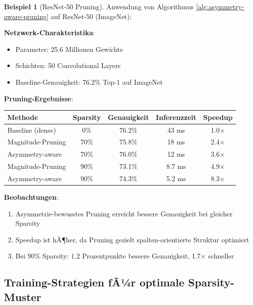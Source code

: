 ﻿\documentclass[a4paper,12pt]{report}
\theoremstyle{definition}
\newtheorem{beispiel}{Beispiel}
\begin{document}
	\begin{beispiel}[ResNet-50 Pruning]
		Anwendung von Algorithmus \ref{alg:asymmetry-aware-pruning} auf ResNet-50 (ImageNet):
		
		\textbf{Netzwerk-Charakteristika}:
		\begin{itemize}
			\item Parameter: 25.6 Millionen Gewichte
			\item Schichten: 50 Convolutional Layers
			\item Baseline-Genauigkeit: 76.2\% Top-1 auf ImageNet
		\end{itemize}
		
		\textbf{Pruning-Ergebnisse}:
		\begin{center}
			\begin{tabular}{|l|c|c|c|c|}
				\hline
				\textbf{Methode} & \textbf{Sparsity} & \textbf{Genauigkeit} & \textbf{Inferenzzeit} & \textbf{Speedup} \\
				\hline
				Baseline (dense) & 0\% & 76.2\% & 43 ms & 1.0$\times$ \\
				Magnitude-Pruning & 70\% & 75.8\% & 18 ms & 2.4$\times$ \\
				Asymmetry-aware & 70\% & 76.0\% & 12 ms & 3.6$\times$ \\
				Magnitude-Pruning & 90\% & 73.1\% & 8.7 ms & 4.9$\times$ \\
				Asymmetry-aware & 90\% & 74.3\% & 5.2 ms & 8.3$\times$ \\
				\hline
			\end{tabular}
		\end{center}
		
		\textbf{Beobachtungen}:
		\begin{enumerate}
			\item Asymmetrie-bewusstes Pruning erreicht bessere Genauigkeit bei gleicher Sparsity
			\item Speedup ist hÃ¶her, da Pruning gezielt spalten-orientierte Struktur optimiert
			\item Bei 90\% Sparsity: 1.2 Prozentpunkte bessere Genauigkeit, 1.7$\times$ schneller
		\end{enumerate}
	\end{beispiel}
	
	\subsection{Training-Strategien fÃ¼r optimale Sparsity-Muster}
	
\end{document}
